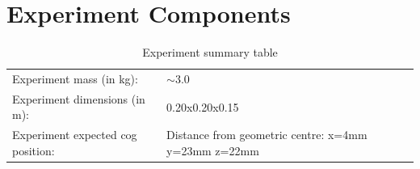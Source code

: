 \section{Experiment Components}

\begin{table}[H]
\centering
\caption{Experiment summary table}
\label{tab:experiment_summary}
\begin{tabular}{L{6cm}L{6cm}}
\toprule
Experiment mass (in kg): & $\sim$3.0 \\
Experiment dimensions (in m): & 0.20x0.20x0.15\\
Experiment expected \gls{cog} position: & Distance from geometric centre: x=4mm y=23mm z=22mm \\
\bottomrule
\end{tabular}
\end{table}

